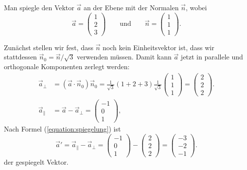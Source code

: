 \begin{beispiel}
Man spiegle den Vektor $\vec a$ an der Ebene mit der Normalen $\vec n$, wobei
\[
\vec a=\begin{pmatrix}1\\2\\3\end{pmatrix}
\qquad
\text{und}
\qquad
\vec n=\begin{pmatrix}1\\1\\1\end{pmatrix}.
\]

\smallskip

{\parindent 0pt Zunächst stellen wir fest,} dass $\vec n$ noch
kein Einheitsvektor ist, dass wir stattdessen $\vec n_0=\vec n/\sqrt{3}$
verwenden müssen.
Damit kann $\vec a$ jetzt in parallele und orthogonale Komponenten
zerlegt werden:
\begin{align*}
\vec a_{\perp}
&=
(\vec a\cdot\vec n_0)\vec n_0
=\frac1{\sqrt{3}} (1+2+3)\frac1{\sqrt{3}}\begin{pmatrix}1\\1\\1\end{pmatrix}
=\begin{pmatrix}2\\2\\2\end{pmatrix}.
\\
\vec a_{\|}
&=
\vec{a}-\vec{a}_{\perp}
=
\begin{pmatrix} -1\\0\\1 \end{pmatrix},
\end{align*}
Nach Formel (\ref{equation:spiegelung}) ist
\[
\vec a'=\vec a_{\|}-\vec a_{\perp}
=
\begin{pmatrix}-1\\0\\1\end{pmatrix}-\begin{pmatrix}2\\2\\2\end{pmatrix}
=\begin{pmatrix}-3\\-2\\-1\end{pmatrix}.
\]
der gespiegelt Vektor.
\end{beispiel}

